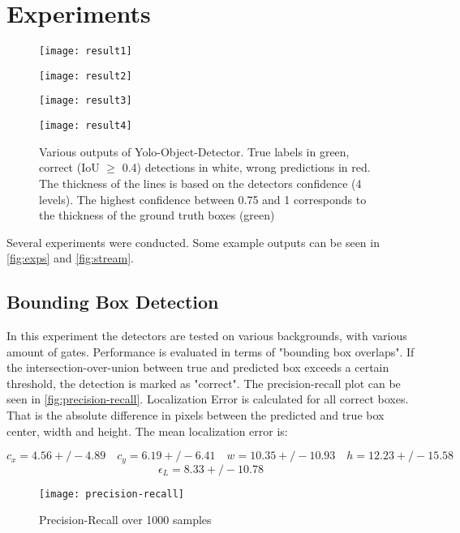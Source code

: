 \documentclass{article}
\begin{document}
\section{Experiments}
\begin{figure}[h]
	\centering
	\begin{minipage}{0.3\textwidth}
		\centering
		\texttt{[image: result1]}
	\end{minipage}
	\begin{minipage}{0.3\textwidth}
		\centering
		\texttt{[image: result2]}
	\end{minipage}

			\begin{minipage}{0.3\textwidth}
			\centering
			\texttt{[image: result3]}
		\end{minipage}
			\begin{minipage}{0.3\textwidth}
			\centering
			\texttt{[image: result4]}
		\end{minipage}
		\caption{Various outputs of Yolo-Object-Detector. True labels in green, correct (IoU $\geq$ 0.4) detections in white, wrong predictions in red. The thickness of the lines is based on the detectors confidence (4 levels). The highest confidence between 0.75 and 1 corresponds to the thickness of the ground truth boxes (green)}
		\label{fig:exps}
\end{figure}
Several experiments were conducted. Some example outputs can be seen in \autoref{fig:exps} and \autoref{fig:stream}. 

\subsection{Bounding Box Detection} 
In this experiment the detectors are tested on various backgrounds, with various amount of gates. Performance is evaluated in terms of "bounding box overlaps". If the intersection-over-union between true and predicted box exceeds a certain threshold, the detection is marked as "correct". The precision-recall plot can be seen in \autoref{fig:precision-recall}. Localization Error is calculated for all correct boxes. That is the absolute difference in pixels between the predicted and true box center, width and height. The mean localization error is:

$$c_x = 4.56 +/- 4.89 \quad c_y = 6.19 +/- 6.41 \quad w = 10.35 +/- 10.93 \quad h = 12.23 +/- 15.58$$
$$\epsilon_L = 8.33 +/- 10.78$$
\begin{figure}[h!]
	\centering
	\texttt{[image: precision-recall]}
	\caption{Precision-Recall over 1000 samples}
	\label{fig:precision-recall}
\end{figure}
\end{document}
